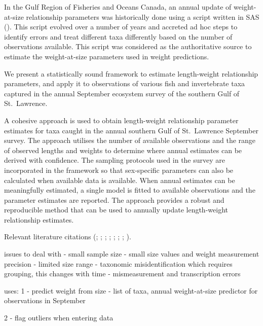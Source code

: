 \documentclass[12pt]{article}\usepackage[]{graphicx}\usepackage[]{color}
\begin{document}
In the Gulf Region of Fisheries and Oceans Canada, an annual update of weight-at-size relationship parameters was historically done using a script written in SAS (). This script evolved over a number of years and accreted ad hoc steps to identify errors and treat different taxa differently based on the number of observations available. This script was considered as the authoritative source to estimate the weight-at-size parameters used in weight predictions.

We present a statistically sound framework to estimate length-weight relationship parameters, and apply it to observations of various fish and invertebrate taxa captured in the annual September ecosystem survey of the southern Gulf of St.~Lawrence.

A cohesive approach is used to obtain length-weight relationship parameter estimates for taxa caught in the annual southern Gulf of St.~Lawrence September survey. The approach utilises the number of available observations and the range of observed lengths and weights to determine where annual estimates can be derived with confidence. The sampling protocols used in the survey are incorporated in the framework so that sex-specific parameters can also be calculated when available data is available. When annual estimates can be meaningfully estimated, a single model is fitted to available observations and the parameter estimates are reported. The approach provides a robust and reproducible method that can be used to annually update length-weight relationship estimates.

Relevant literature citations (; ; ; ; ; ; ; ).

issues to deal with - small sample size - small size values and weight measurement precision - limited size range - taxonomic misidentification which requires grouping, this changes with time - mismeasurement and transcription errors

uses: 1 - predict weight from size - list of taxa, annual weight-at-size predictor for observations in September

2 - flag outliers when entering data
\end{document}
